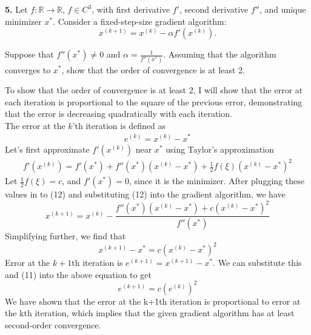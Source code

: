 \documentclass[12pt]{article}
\begin{document}
\begin{mybluebox}
  \textbf{5.} Let \( f : \mathbb{R} \to \mathbb{R} \), \( f \in C^3 \), with first derivative \( f' \), second derivative \( f'' \), and unique minimizer \( x^* \). Consider a fixed-step-size gradient algorithm:
\[
x^{(k+1)} = x^{(k)} - \alpha f'\left( x^{(k)} \right).
\]

Suppose that \( f''(x^*) \neq 0 \) and \( \alpha = \frac{1}{f''(x^*)} \). Assuming that the algorithm converges to \( x^* \), show that the order of convergence is at least 2.
\end{mybluebox}
To show that the order of convergence is at least 2, I will show that the error at each iteration is proportional to the square of the previous error, demonstrating that the error
is decreasing quadratically with each iteration. \\
The error at the $k$'th iteration is defined as 
\begin{align}
  e^{(k)} = x^{(k)} - x^*  
\end{align}
Let's first approximate $f'(x^{(k)})$ near $x^*$ using Taylor's approximation
\begin{align} f'(x^{(k)}) =  f'(x^{*})+f''(x^*)(x^{(k)}-x^*)+\frac{1}{2}f(\xi )(x^{(k)} - x^*)^2 \end{align}
Let $\frac{1}{2}f(\xi ) = c$, and $f'(x^*) = 0$, since it is the minimizer. After plugging these values in to (12) and substituting (12) into the gradient algorithm, we have
\[x^{(k+1)} = x^{(k)} - \frac{f''(x^*)(x^{(k)} - x^*) + c(x^{(k)}-x^*)^2}{f''(x^*)}\]
Simplifying further, we find that 
\[x^{(k+1)} - x^* = c(x^{(k)} - x^*)^2\]
Error at the $k+1$th iteration is $e^{(k+1)} = x^{(k+1)} - x^*$. We can substitute this and (11) into the above equation to get \\
\[e^{(k+1)} = c(e^{(k)})^2\]
We have shown that the error at the k+1th iteration is proportional to error at the kth iteration, which implies that the given gradient algorithm has at least second-order convergence.
\end{document}
